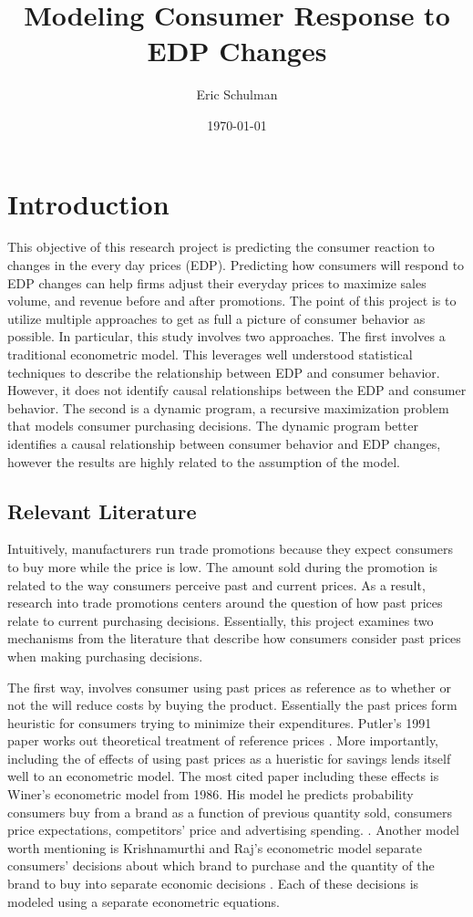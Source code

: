 \documentclass{article}
\title{Modeling Consumer Response to EDP Changes}
\author{Eric Schulman}
\date{\today}
\begin{document}
\maketitle

\section{Introduction}

This objective of this research project is predicting the consumer reaction to changes in the every day prices (EDP). Predicting how consumers will respond to EDP changes can help firms adjust their everyday prices to maximize sales volume, and revenue before and after promotions. The point of this project is to utilize multiple approaches to get as full a picture of consumer behavior as possible. In particular, this study involves two approaches. The first involves a traditional econometric model. This leverages well understood statistical techniques to describe the relationship between EDP and consumer behavior. However, it does not identify causal relationships between the EDP and consumer behavior. The second is a dynamic program, a recursive maximization problem that models consumer purchasing decisions. The dynamic program better identifies a causal relationship between consumer behavior and EDP changes, however the results are highly related to the assumption of the model.

\subsection{Relevant Literature}

Intuitively, manufacturers run trade promotions because they expect consumers to buy more while the price is low. The amount sold during the promotion is related to the way consumers perceive past and current prices. As a result, research into trade promotions centers around the question of how past prices relate to current purchasing decisions. Essentially, this project examines two mechanisms from the literature that describe how consumers consider past prices when making purchasing decisions.

The first way, involves consumer using past prices as reference as to whether or not the will reduce costs by buying the product. Essentially the past prices form heuristic for consumers trying to minimize their expenditures. Putler's 1991 paper works out theoretical treatment of reference prices \cite{putler}. More importantly, including the of effects of using past prices as a hueristic for savings lends itself well to an econometric model. The most cited paper including these effects is Winer's econometric model from 1986. His model he predicts probability consumers buy from a brand as a function of previous quantity sold, consumers price expectations, competitors' price and advertising spending.  \cite{winer}. Another model worth mentioning is Krishnamurthi and Raj's econometric model separate consumers' decisions about which brand to purchase and the quantity of the brand to buy into separate economic decisions \cite{krishnamurthi}. Each of these decisions is modeled using a separate econometric equations. 
\end{document}
